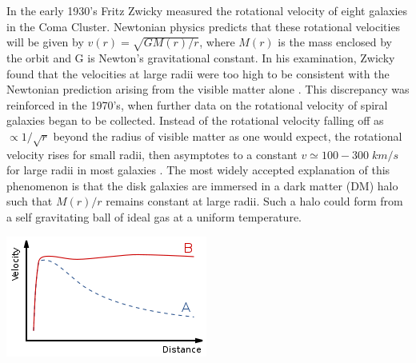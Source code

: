 \documentclass[a4paper,12pt]{article}
\begin{document}
In the early 1930's Fritz Zwicky measured the rotational velocity of eight galaxies in the Coma Cluster.  Newtonian physics predicts that these rotational velocities will be given by $v(r)=\sqrt{GM(r)/r}$, where $M(r)$ is the mass enclosed by the orbit and G is Newton's gravitational constant.  In his examination, Zwicky found that the velocities at large radii were too high to be consistent with the Newtonian prediction arising from the visible matter alone \cite{Zwicky}. This discrepancy was reinforced in the 1970's, when further data on the rotational velocity of spiral galaxies began to be collected.  Instead of the rotational velocity falling off as $\propto 1/\sqrt{r}$ beyond the radius of visible matter as one would expect, the rotational velocity rises for small radii, then asymptotes to a constant $ v \simeq 100-300 \; km/s $ for large radii in most galaxies \cite{Persic,Battaner,Binney}.  The most widely accepted explanation of this phenomenon is that the disk galaxies are immersed in a dark matter (DM) halo such that $ M(r)/r $ remains constant at large radii.  Such a halo could form from a self gravitating ball of ideal gas at a uniform temperature.

\begin{center}
\includegraphics[scale=1]{RotationCurve.png}
\end{center}
\end{document}
